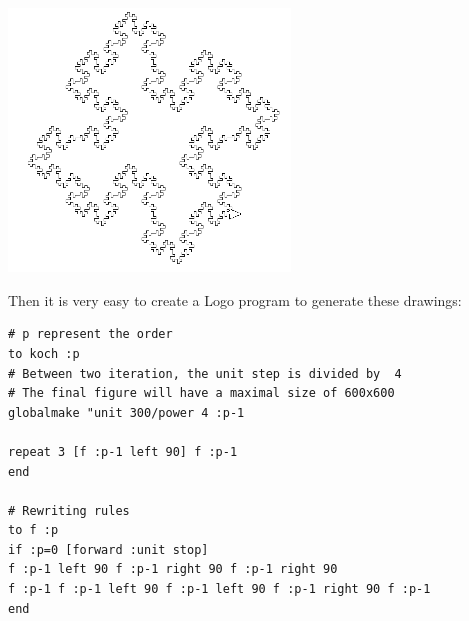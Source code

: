 \begin{center}
\begin{minipage}{7.5cm}
\end{minipage}
\begin{minipage}{7.5cm}
 \includegraphics[width=7.5cm]{pics/linden-koch4.png}
\end{minipage}
\end{center}
Then it is very easy to create a Logo program to generate these drawings:
\begin{verbatim}
# p represent the order
to koch :p
# Between two iteration, the unit step is divided by  4
# The final figure will have a maximal size of 600x600 
globalmake "unit 300/power 4 :p-1

repeat 3 [f :p-1 left 90] f :p-1 
end

# Rewriting rules
to f :p
if :p=0 [forward :unit stop]
f :p-1 left 90 f :p-1 right 90 f :p-1 right 90
f :p-1 f :p-1 left 90 f :p-1 left 90 f :p-1 right 90 f :p-1
end
\end{verbatim}
